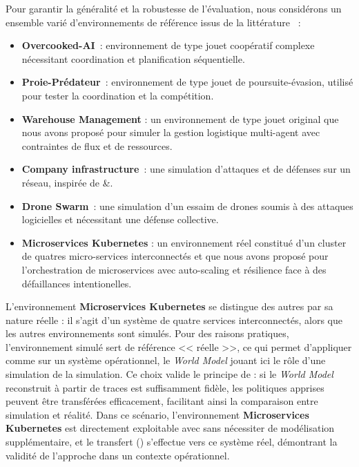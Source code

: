 Pour garantir la généralité et la robustesse de l’évaluation, nous considérons un ensemble varié d’environnements de référence issus de la littérature ~:
\begin{itemize}
  \item \textbf{Overcooked-AI}~\cite{overcookedai}: environnement de type jouet coopératif complexe nécessitant coordination et planification séquentielle.
  \item \textbf{Proie-Prédateur}~\cite{lowe2017multi}: environnement  de type jouet de poursuite-évasion, utilisé pour tester la coordination et la compétition.
  \item \textbf{Warehouse Management} : un environnement  de type jouet original que nous avons proposé pour simuler la gestion logistique multi-agent avec contraintes de flux et de ressources.
  \item \textbf{Company infrastructure}~\cite{cyberbattlesim}: une simulation d’attaques et de défenses sur un réseau, inspirée de  \&.
  \item \textbf{Drone Swarm}~\cite{cage_challenge_3_announcement}: une simulation d'un essaim de drones soumis à des attaques logicielles et nécessitant une défense collective.
  \item \textbf{Microservices Kubernetes} : un environnement réel constitué d'un cluster de quatres micro-services interconnectés et que nous avons proposé pour l'orchestration de microservices avec auto-scaling et résilience face à des défaillances intentionelles.
\end{itemize}

L’environnement \textbf{Microservices Kubernetes} se distingue des autres par sa nature réelle : il s’agit d’un système de quatre services interconnectés, alors que les autres environnements sont simulés. Pour des raisons pratiques, l’environnement simulé sert de référence << réelle >>, ce qui permet d’appliquer  comme sur un système opérationnel, le \textit{World Model} jouant ici le rôle d’une simulation de la simulation. Ce choix valide le principe de  : si le \textit{World Model} reconstruit à partir de traces est suffisamment fidèle, les politiques apprises peuvent être transférées efficacement, facilitant ainsi la comparaison entre simulation et réalité. Dans ce scénario, l’environnement \textbf{Microservices Kubernetes} est directement exploitable avec  sans nécessiter de modélisation supplémentaire, et le transfert () s’effectue vers ce système réel, démontrant la validité de l’approche dans un contexte opérationnel.

